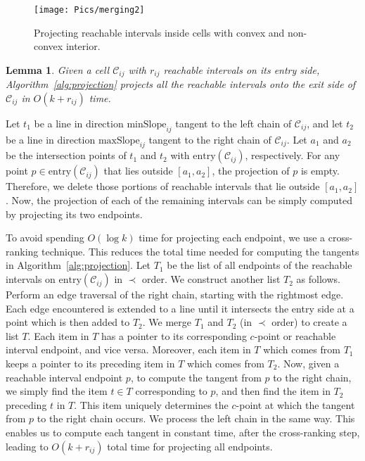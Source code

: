 \documentclass[12pt]{dalthesis}
\def\favoritefont{\bfseries \sffamily}
\def\QED{\ensuremath{{\Box}}}
\def\markatright#1{\leavevmode\unskip\nobreak\quad\hspace*{\fill}{#1}}
\newenvironment{proof}
	{\begin{trivlist}\item[\hskip\labelsep{\favoritefont Proof:}]}
	{\markatright{\QED}\end{trivlist}}
\newtheorem{lemma}[theorem]{Lemma}
\newcommand{\CC}{{\mathscr C}}
\newcommand{\cell}[1]{{\CC_{#1}}}
\newcommand{\minS}[1]{\mbox{minSlope}_{#1}}
\newcommand{\maxS}[1]{\mbox{maxSlope}_{#1}}
\newcommand{\entry}[1]{\mbox{entry}(\cell{#1})}
\newcommand{\lei}{\prec}
\begin{document}
\begin{figure}[h]
	\centering
	\texttt{[image: Pics/merging2]}
	\caption{ 
Projecting reachable intervals inside cells with convex and non-convex interior. 
	}
	\label{fig:merging}
\end{figure}


\begin{lemma} \label{thm:naive}
	Given a cell $\cell{ij}$ with $r_{ij}$ reachable intervals on its entry side, 
	Algorithm~\ref{alg:projection} projects all the reachable intervals onto the exit side of $\cell{ij}$
	in $O(k+r_{ij})$ time.
\end{lemma}

\begin{proof}
Let $t_1$ be a line in direction $\minS{ij}$ 
tangent to the left chain of $\cell{ij}$,
and let $t_2$ be a line in direction $\maxS{ij}$ 
tangent to the right chain of $\cell{ij}$.
Let $a_1$ and $a_2$ be the intersection points of $t_1$ and $t_2$
with $\entry{ij}$, respectively.
For any point $p \in \entry{ij}$
that lies outside $[a_1, a_2]$, the projection of $p$ is empty. Therefore, we delete those portions of reachable intervals
that lie outside $[a_1, a_2]$. 
Now, the projection of each of the remaining intervals can be simply computed 
by projecting its two endpoints.


To avoid spending $O(\log k)$ time for projecting each endpoint, 
we use a cross-ranking technique. This reduces the total time needed for computing the tangents in Algorithm~\ref{alg:projection}.
Let $T_1$ be the list of all endpoints of the reachable intervals on $\entry{ij}$ in $\lei$ order.
We construct another list $T_2$ as follows. 
Perform an edge traversal of the right chain, starting with the rightmost edge.
Each edge encountered is extended to a line until it intersects the entry side at a point
which is then added to $T_2$.
We merge $T_1$ and $T_2$ (in $\lei$ order) to create a list $T$.
Each item in $T$ has a pointer to its corresponding $c$-point or reachable interval endpoint, and vice versa.
Moreover, each item in $T$ which comes from $T_1$
keeps a pointer to its preceding item in $T$ which comes from $T_2$.
Now, given a reachable interval endpoint $p$, to compute the tangent from $p$ to the right chain,
we simply find the item $t \in T$ corresponding to $p$, 
and then find the item in $T_2$ preceding $t$ in $T$. This item
uniquely determines the $c$-point at which the tangent from $p$ to the right chain occurs.
We process the left chain in the same way.
This enables us to compute each tangent in constant time, after the cross-ranking step,
leading to $O(k+r_{ij})$ total time for projecting all endpoints.
\end{proof}
\end{document}
